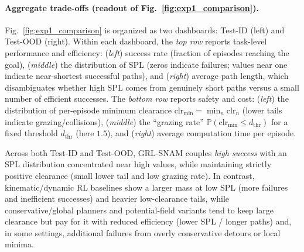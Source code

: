 \paragraph{Aggregate trade-offs (readout of Fig.~\ref{fig:exp1_comparison}).}
{Fig.~\ref{fig:exp1_comparison} is organized as two dashboards: Test-ID (left) and Test-OOD (right).
Within each dashboard, the \emph{top row} reports task-level performance and efficiency:
(\textit{left}) success rate (fraction of episodes reaching the goal),
(\textit{middle}) the distribution of SPL (zeros indicate failures; values near one indicate near-shortest successful paths),
and (\textit{right}) average path length, which disambiguates whether high SPL comes from genuinely short paths versus a small number of efficient successes.
The \emph{bottom row} reports safety and cost:
(\textit{left}) the distribution of per-episode minimum clearance
$\mathrm{clr}_{\min}=\min_n \mathrm{clr}_n$ (lower tails indicate grazing/collisions),
(\textit{middle}) the “grazing rate” $\mathbb{P}(\mathrm{clr}_{\min}\le d_{\text{thr}})$ for a fixed threshold $d_{\text{thr}}$ (here $1.5$),
and (\textit{right}) average computation time per episode.

Across both Test-ID and Test-OOD, GRL-SNAM couples \emph{high success} with an SPL distribution concentrated near high values, while maintaining strictly positive clearance (small lower tail and low grazing rate).
In contrast, kinematic/dynamic RL baselines show a larger mass at low SPL (more failures and inefficient successes) and heavier low-clearance tails, while conservative/global planners and potential-field variants tend to keep large clearance but pay for it with reduced efficiency (lower SPL / longer paths) and, in some settings, additional failures from overly conservative detours or local minima.}

